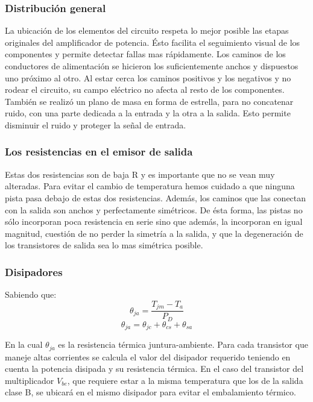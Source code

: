 \subsubsection*{Distribución general}
La ubicación de los elementos del circuito respeta lo mejor posible las etapas originales del amplificador de potencia. Ésto facilita el seguimiento visual de los componentes y permite detectar fallas mas rápidamente.
Los caminos de los conductores de alimentación se hicieron los suficientemente anchos y dispuestos uno próximo al otro. Al estar cerca los caminos positivos y los negativos y no rodear el circuito, su campo eléctrico no afecta al resto de los componentes.
También se realizó un plano de masa en forma de estrella, para no concatenar ruido, con una parte dedicada a la entrada y la otra a la salida. Esto permite disminuir el ruido y proteger la señal de entrada.


\subsubsection*{Los resistencias en el emisor de salida}
Estas dos resistencias son de baja R y es importante que no se vean muy alteradas. Para evitar el cambio de temperatura hemos cuidado a que ninguna pista pasa debajo de estas dos resistencias. Además, los caminos que las conectan con la salida son anchos y perfectamente simétricos. De ésta forma, las pistas no sólo incorporan poca resistencia en serie sino que además, la incorporan en igual magnitud, cuestión de no perder la simetría a la salida, y que la degeneración de los transistores de salida sea lo mas simétrica posible.


\subsubsection{Disipadores}
\bigskip
Sabiendo que:
$$
   \theta_{ja}=\dfrac{T_{jm}-T_a}{P_D}
$$
$$
	\theta_{ja}=\theta_{jc}+\theta_{cs}+\theta_{sa}
$$

En la cual $\theta_{ja}$ es la resistencia térmica juntura-ambiente. Para cada transistor que maneje altas corrientes se calcula el valor del disipador requerido teniendo en cuenta la potencia disipada y su resistencia térmica. En el caso del transistor del multiplicador $V_{be}$, que requiere estar a la misma temperatura que los de la salida clase B, se ubicará en el mismo disipador para evitar el embalamiento térmico.

